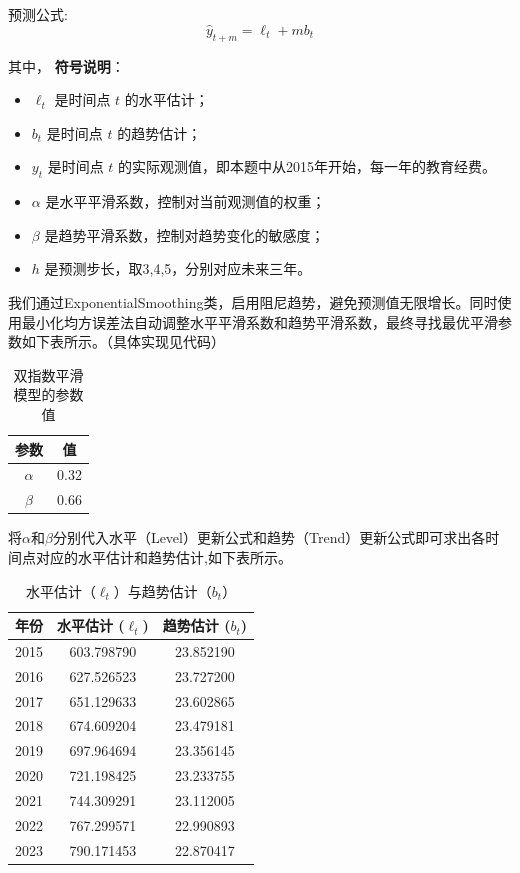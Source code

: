 \documentclass[UTF8, zihao=-4]{ctexart}
\begin{document}
预测公式:
\[
\hat{y}_{t+m} = \ell_t + m b_t
\]

其中，
\textbf{符号说明}：
\begin{itemize}
  \item $\ell_t$ 是时间点 $t$ 的水平估计；
  \item $b_t$ 是时间点 $t$ 的趋势估计；
  \item $y_t$ 是时间点 $t$ 的实际观测值，即本题中从2015年开始，每一年的教育经费。
  \item $\alpha$ 是水平平滑系数，控制对当前观测值的权重；
  \item $\beta$ 是趋势平滑系数，控制对趋势变化的敏感度；
  \item $h$ 是预测步长，取3,4,5，分别对应未来三年。
\end{itemize}

我们通过ExponentialSmoothing类，启用阻尼趋势，避免预测值无限增长。同时使用最小化均方误差法自动调整水平平滑系数和趋势平滑系数，最终寻找最优平滑参数如下表所示。（具体实现见代码）

\begin{table}[h]
    \centering
    \begin{tabular}{|c|c|}
    \hline
    \textbf{参数} & \textbf{值} \\ \hline
    $\alpha$ & 0.32 \\ \hline
    $\beta$ & 0.66 \\ \hline
    \end{tabular}
    \caption{双指数平滑模型的参数值}
    \end{table}

将$\alpha$和$\beta$分别代入水平（Level）更新公式和趋势（Trend）更新公式即可求出各时间点对应的水平估计和趋势估计,如下表所示。
\begin{table}[h]
    \centering
    \begin{tabular}{|c|c|c|}
    \hline
    \textbf{年份} & \textbf{水平估计 ($\ell_t$)} & \textbf{趋势估计 ($b_t$)} \\ \hline
    2015 & 603.798790 & 23.852190 \\ \hline
    2016 & 627.526523 & 23.727200 \\ \hline
    2017 & 651.129633 & 23.602865 \\ \hline
    2018 & 674.609204 & 23.479181 \\ \hline
    2019 & 697.964694 & 23.356145 \\ \hline
    2020 & 721.198425 & 23.233755 \\ \hline
    2021 & 744.309291 & 23.112005 \\ \hline
    2022 & 767.299571 & 22.990893 \\ \hline
    2023 & 790.171453 & 22.870417 \\ \hline
    \end{tabular}
    \caption{水平估计（$\ell_t$）与趋势估计（$b_t$）}
    \end{table}
    
\end{document}

